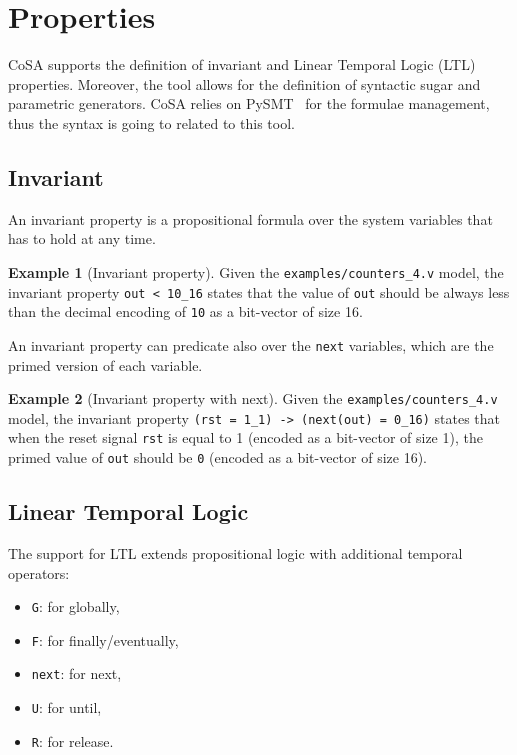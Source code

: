 \documentclass{article}
\theoremstyle{definition}
\newtheorem{example}{Example}[section]
\begin{document}
\section{Properties}
\label{sec:properties}

CoSA supports the definition of invariant and Linear Temporal Logic
(LTL) properties. Moreover, the tool allows for the definition of
syntactic sugar and parametric generators. CoSA relies on
PySMT~\cite{gario2015pysmt} for the formulae management, thus the
syntax is going to related to this tool.

\subsection{Invariant}
An invariant property is a propositional formula over the system
variables that has to hold at any time. 

\begin{example}[Invariant property]
  Given the \texttt{examples/counters\_4.v} model, the invariant property
  \texttt{out < 10\_16} states that the value of \texttt{out} should
  be always less than the decimal encoding of \texttt{10} as a
  bit-vector of size {16}.
\end{example}

An invariant property can predicate also over the \texttt{next}
variables, which are the primed version of each variable.

\begin{example}[Invariant property with next]
  Given the \texttt{examples/counters\_4.v} model, the invariant property
  \texttt{(rst = 1\_1) -> (next(out) = 0\_16)} states that when the reset
  signal \texttt{rst} is equal to 1 (encoded as a bit-vector of size
  {1}), the primed value of \texttt{out} should be \texttt{0} (encoded
  as a bit-vector of size {16}).
\end{example}

\subsection{Linear Temporal Logic}
The support for LTL extends propositional logic with additional
temporal operators:
\begin{itemize}
\item \texttt{G}: for globally,
\item \texttt{F}: for finally/eventually,
\item \texttt{next}: for next,
\item \texttt{U}: for until,
\item \texttt{R}: for release.
\end{itemize}
\end{document}
